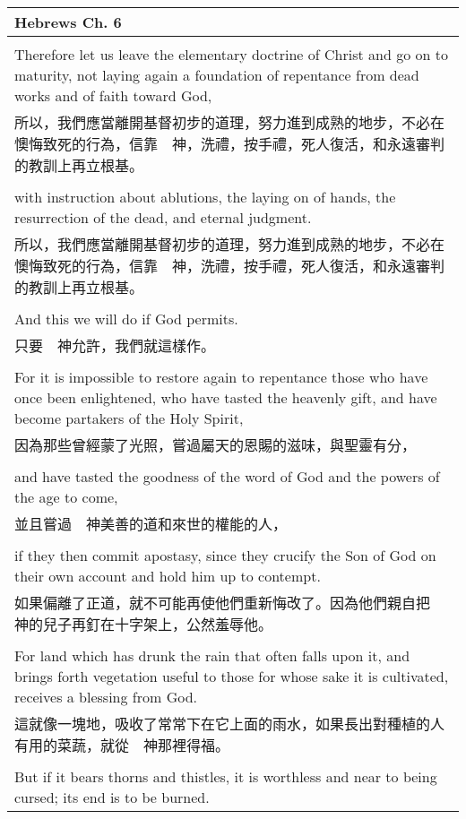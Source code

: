 \documentclass{book}
\begin{document}
\begin{tabularx}{\textwidth}{p{}}
\hline
Hebrews Ch. 6 \\
\hline \\
Therefore let us leave the elementary doctrine of Christ and go on to maturity, not laying again a foundation of repentance from dead works and of faith toward God, \\
所以，我們應當離開基督初步的道理，努力進到成熟的地步，不必在懊悔致死的行為，信靠　神，洗禮，按手禮，死人復活，和永遠審判的教訓上再立根基。 \\ \\
with instruction about ablutions, the laying on of hands, the resurrection of the dead, and eternal judgment. \\
所以，我們應當離開基督初步的道理，努力進到成熟的地步，不必在懊悔致死的行為，信靠　神，洗禮，按手禮，死人復活，和永遠審判的教訓上再立根基。 \\ \\
And this we will do if God permits. \\
只要　神允許，我們就這樣作。 \\ \\
For it is impossible to restore again to repentance those who have once been enlightened, who have tasted the heavenly gift, and have become partakers of the Holy Spirit, \\
因為那些曾經蒙了光照，嘗過屬天的恩賜的滋味，與聖靈有分， \\ \\
and have tasted the goodness of the word of God and the powers of the age to come, \\
並且嘗過　神美善的道和來世的權能的人， \\ \\
if they then commit apostasy, since they crucify the Son of God on their own account and hold him up to contempt. \\
如果偏離了正道，就不可能再使他們重新悔改了。因為他們親自把　神的兒子再釘在十字架上，公然羞辱他。 \\ \\
For land which has drunk the rain that often falls upon it, and brings forth vegetation useful to those for whose sake it is cultivated, receives a blessing from God. \\
這就像一塊地，吸收了常常下在它上面的雨水，如果長出對種植的人有用的菜蔬，就從　神那裡得福。 \\ \\
But if it bears thorns and thistles, it is worthless and near to being cursed; its end is to be burned. \\

\end{tabularx}
\end{document}
